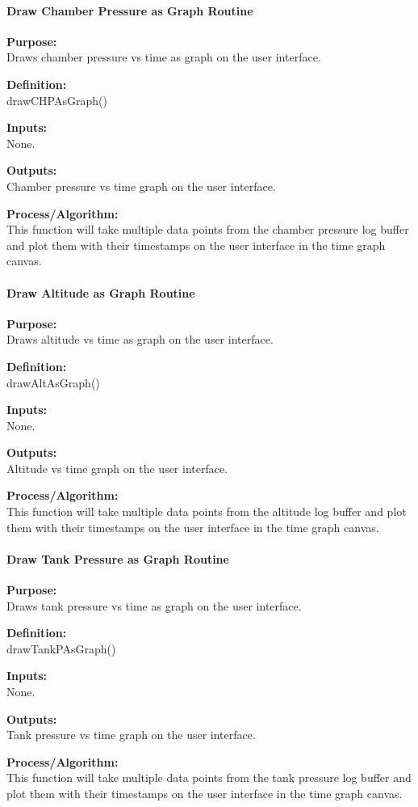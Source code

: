 \documentclass[10pt,draftclsnofoot,onecolumn,retainorgcmds]{IEEEtran}
\begin{document}
\paragraph{Draw Chamber Pressure as Graph Routine}
{\bf Purpose:} \\
Draws chamber pressure vs time as graph on the user interface. \par
{\bf Definition:} \\ 
drawCHPAsGraph() \par
{\bf Inputs:} \\None. \par
{\bf Outputs:} \\Chamber pressure vs time graph on the user interface.\par
{\bf Process/Algorithm:} \\
This function will take multiple data points from the chamber pressure log buffer and plot them with their timestamps on the user interface in the time graph canvas.  \par

\paragraph{Draw Altitude as Graph Routine}
{\bf Purpose:} \\
Draws altitude vs time as graph on the user interface. \par
{\bf Definition:} \\ 
drawAltAsGraph() \par
{\bf Inputs:} \\None. \par
{\bf Outputs:} \\Altitude vs time graph on the user interface.\par
{\bf Process/Algorithm:} \\
This function will take multiple data points from the altitude log buffer and plot them with their timestamps on the user interface in the time graph canvas.  \par

\paragraph{Draw Tank Pressure as Graph Routine}
{\bf Purpose:} \\
Draws tank pressure vs time as graph on the user interface. \par
{\bf Definition:} \\ 
drawTankPAsGraph()\par
{\bf Inputs:} \\None. \par
{\bf Outputs:} \\Tank pressure vs time graph on the user interface.\par
{\bf Process/Algorithm:} \\
This function will take multiple data points from the tank pressure log buffer and plot them with their timestamps on the user interface in the time graph canvas.  \par
\end{document}
